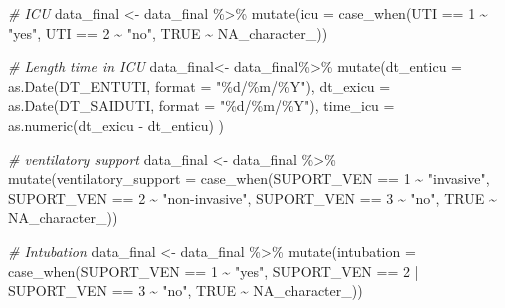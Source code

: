 \documentclass[
]{article}
\newenvironment{Shaded}{\begin{snugshade}}{\end{snugshade}}
\newcommand{\AttributeTok}[1]{\textcolor[rgb]{0.77,0.63,0.00}{#1}}
\newcommand{\CommentTok}[1]{\textcolor[rgb]{0.56,0.35,0.01}{\textit{#1}}}
\newcommand{\ConstantTok}[1]{\textcolor[rgb]{0.00,0.00,0.00}{#1}}
\newcommand{\DecValTok}[1]{\textcolor[rgb]{0.00,0.00,0.81}{#1}}
\newcommand{\FunctionTok}[1]{\textcolor[rgb]{0.00,0.00,0.00}{#1}}
\newcommand{\NormalTok}[1]{#1}
\newcommand{\OtherTok}[1]{\textcolor[rgb]{0.56,0.35,0.01}{#1}}
\newcommand{\SpecialCharTok}[1]{\textcolor[rgb]{0.00,0.00,0.00}{#1}}
\newcommand{\StringTok}[1]{\textcolor[rgb]{0.31,0.60,0.02}{#1}}
\begin{document}
\begin{Shaded}
\begin{Highlighting}[]
\CommentTok{\# ICU}
\NormalTok{data\_final }\OtherTok{\textless{}{-}}\NormalTok{ data\_final }\SpecialCharTok{\%\textgreater{}\%}
  \FunctionTok{mutate}\NormalTok{(}\AttributeTok{icu =} \FunctionTok{case\_when}\NormalTok{(UTI }\SpecialCharTok{==} \DecValTok{1} \SpecialCharTok{\textasciitilde{}} \StringTok{"yes"}\NormalTok{,}
\NormalTok{                         UTI }\SpecialCharTok{==} \DecValTok{2} \SpecialCharTok{\textasciitilde{}} \StringTok{"no"}\NormalTok{,}
                         \ConstantTok{TRUE} \SpecialCharTok{\textasciitilde{}} \ConstantTok{NA\_character\_}\NormalTok{))}


\CommentTok{\# Length time in ICU}
\NormalTok{data\_final}\OtherTok{\textless{}{-}}\NormalTok{  data\_final}\SpecialCharTok{\%\textgreater{}\%} 
  \FunctionTok{mutate}\NormalTok{(}\AttributeTok{dt\_enticu  =} \FunctionTok{as.Date}\NormalTok{(DT\_ENTUTI,  }\AttributeTok{format =} \StringTok{"\%d/\%m/\%Y"}\NormalTok{),}
         \AttributeTok{dt\_exicu =} \FunctionTok{as.Date}\NormalTok{(DT\_SAIDUTI, }\AttributeTok{format =} \StringTok{"\%d/\%m/\%Y"}\NormalTok{), }
         \AttributeTok{time\_icu =} \FunctionTok{as.numeric}\NormalTok{(dt\_exicu }\SpecialCharTok{{-}}\NormalTok{ dt\_enticu)}
\NormalTok{  )}

\CommentTok{\# ventilatory support}
\NormalTok{data\_final }\OtherTok{\textless{}{-}}\NormalTok{ data\_final }\SpecialCharTok{\%\textgreater{}\%} 
  \FunctionTok{mutate}\NormalTok{(}\AttributeTok{ventilatory\_support =} \FunctionTok{case\_when}\NormalTok{(SUPORT\_VEN }\SpecialCharTok{==} \DecValTok{1} \SpecialCharTok{\textasciitilde{}} \StringTok{"invasive"}\NormalTok{,}
\NormalTok{                                SUPORT\_VEN }\SpecialCharTok{==} \DecValTok{2} \SpecialCharTok{\textasciitilde{}} \StringTok{"non{-}invasive"}\NormalTok{,}
\NormalTok{                                  SUPORT\_VEN }\SpecialCharTok{==} \DecValTok{3} \SpecialCharTok{\textasciitilde{}} \StringTok{"no"}\NormalTok{,}
                                \ConstantTok{TRUE} \SpecialCharTok{\textasciitilde{}} \ConstantTok{NA\_character\_}\NormalTok{))}

\CommentTok{\# Intubation}
\NormalTok{data\_final }\OtherTok{\textless{}{-}}\NormalTok{ data\_final }\SpecialCharTok{\%\textgreater{}\%} 
  \FunctionTok{mutate}\NormalTok{(}\AttributeTok{intubation =} \FunctionTok{case\_when}\NormalTok{(SUPORT\_VEN }\SpecialCharTok{==} \DecValTok{1} \SpecialCharTok{\textasciitilde{}} \StringTok{"yes"}\NormalTok{,}
\NormalTok{                                SUPORT\_VEN }\SpecialCharTok{==} \DecValTok{2} \SpecialCharTok{|}\NormalTok{ SUPORT\_VEN }\SpecialCharTok{==} \DecValTok{3} \SpecialCharTok{\textasciitilde{}} \StringTok{"no"}\NormalTok{,}
                                \ConstantTok{TRUE} \SpecialCharTok{\textasciitilde{}} \ConstantTok{NA\_character\_}\NormalTok{))}
\end{Highlighting}
\end{Shaded}
\end{document}
